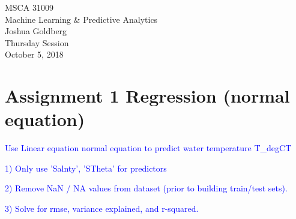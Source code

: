\documentclass{article}
\begin{document}
\begin{flushright}
	MSCA 31009 \\
  Machine Learning \& Predictive Analytics \\
	Joshua Goldberg \\
  Thursday Session \\
	October 5, 2018
\end{flushright}

\section*{Assignment 1 Regression (normal equation)}
\textcolor{blue}{Use Linear equation normal equation to predict water temperature T\_degCT}

\textcolor{blue}{1) Only use 'Salnty', 'STheta' for predictors}

\textcolor{blue}{2) Remove NaN / NA values from dataset (prior to building train/test sets).}

\textcolor{blue}{3) Solve for rmse, variance explained, and r-squared.}
\end{document}

